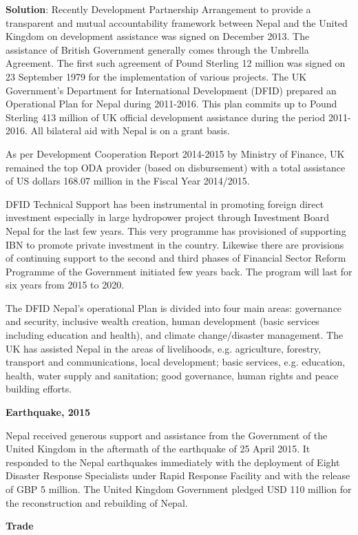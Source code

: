 \documentclass[
]{book}
\newenvironment{solution}{ {\bfseries Solution}:}{}
\begin{document}
\begin{solution}
Recently Development Partnership Arrangement to provide a transparent and mutual accountability framework between Nepal and the United Kingdom on development assistance was signed on December 2013. The assistance of British Government generally comes through the Umbrella Agreement. The first such agreement of Pound Sterling 12 million was signed on 23 September 1979 for the implementation of various projects. The UK Government’s Department for International Development (DFID) prepared an Operational Plan for Nepal during 2011-2016. This plan commits up to Pound Sterling 413 million of UK official development assistance during the period 2011-2016. All bilateral aid with Nepal is on a grant basis.

As per Development Cooperation Report 2014-2015 by Ministry of Finance, UK remained the top ODA provider (based on disbursement) with a total assistance of US dollars 168.07 million in the Fiscal Year 2014/2015.

DFID Technical Support has been instrumental in promoting foreign direct investment especially in large hydropower project through Investment Board Nepal for the last few years. This very programme has provisioned of supporting IBN to promote private investment in the country. Likewise there are provisions of continuing support to the second and third phases of Financial Sector Reform Programme of the Government initiated few years back. The program will last for six years from 2015 to 2020.

The DFID Nepal's operational Plan is divided into four main areas: governance and security, inclusive wealth creation, human development (basic services including education and health), and climate change/disaster management. The UK has assisted Nepal in the areas of livelihoods, e.g. agriculture, forestry, transport and communications, local development; basic services, e.g. education, health, water supply and sanitation; good governance, human rights and peace building efforts.

\textbf{Earthquake, 2015}

Nepal received generous support and assistance from the Government of the United Kingdom in the aftermath of the earthquake of 25 April 2015. It responded to the Nepal earthquakes immediately with the deployment of Eight Disaster Response Specialists under Rapid Response Facility and with the release of GBP 5 million. The United Kingdom Government pledged USD 110 million for the reconstruction and rebuilding of Nepal. 

\textbf{Trade}


\end{solution}
\end{document}
